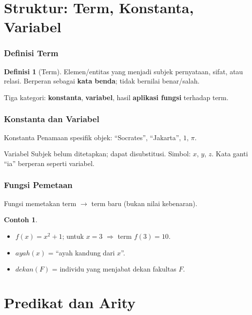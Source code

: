\documentclass[handout]{beamer}
\theoremstyle{definition}
\newtheorem{definisi}[theorem]{Definisi}
\theoremstyle{example}
\newtheorem{contoh}[theorem]{Contoh}
\begin{document}
\section{Struktur: Term, Konstanta, Variabel}

\begin{frame}
\frametitle{Definisi Term}
\begin{definisi}[Term]
Elemen/entitas yang menjadi subjek pernyataan, sifat, atau relasi. Berperan sebagai \textbf{kata benda}; tidak bernilai benar/salah.
\end{definisi}
Tiga kategori: \textbf{konstanta}, \textbf{variabel}, hasil \textbf{aplikasi fungsi} terhadap term.
\end{frame}

\begin{frame}
\frametitle{Konstanta dan Variabel}
\begin{block}{Konstanta}
Penamaan spesifik objek: ``Socrates'', ``Jakarta'', $1$, $\pi$.
\end{block}
\begin{block}{Variabel}
Subjek belum ditetapkan; dapat disubstitusi. Simbol: $x$, $y$, $z$. Kata ganti ``ia'' berperan seperti variabel.
\end{block}
\end{frame}

\begin{frame}
\frametitle{Fungsi Pemetaan}
Fungsi memetakan term $\to$ term baru (bukan nilai kebenaran).
\begin{contoh}
\begin{itemize}
  \item $f(x) = x^2 + 1$; untuk $x=3$ $\Rightarrow$ term $f(3)=10$.
  \item $ayah(x)$ = ``ayah kandung dari $x$''.
  \item $dekan(F)$ = individu yang menjabat dekan fakultas $F$.
\end{itemize}
\end{contoh}
\end{frame}

\section{Predikat dan Arity}
\end{document}
